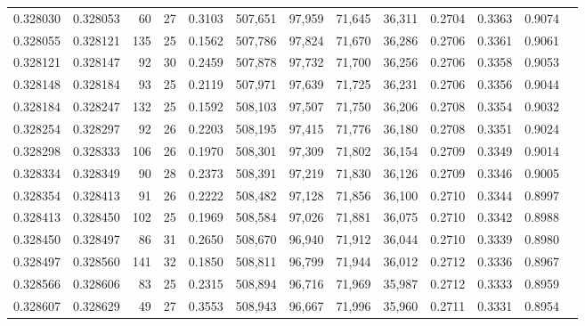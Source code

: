 \begin{tabular}{rrrrrrrrrrrrr}
0.328030 & 0.328053 &    60 &  27 &                                     0.3103 & 507,651 &  97,959 &  71,645 &  36,311 & 0.2704 & 0.3363 & 0.9074 \\
0.328055 & 0.328121 &   135 &  25 &                                     0.1562 & 507,786 &  97,824 &  71,670 &  36,286 & 0.2706 & 0.3361 & 0.9061 \\
0.328121 & 0.328147 &    92 &  30 &                                     0.2459 & 507,878 &  97,732 &  71,700 &  36,256 & 0.2706 & 0.3358 & 0.9053 \\
0.328148 & 0.328184 &    93 &  25 &                                     0.2119 & 507,971 &  97,639 &  71,725 &  36,231 & 0.2706 & 0.3356 & 0.9044 \\
0.328184 & 0.328247 &   132 &  25 &                                     0.1592 & 508,103 &  97,507 &  71,750 &  36,206 & 0.2708 & 0.3354 & 0.9032 \\
0.328254 & 0.328297 &    92 &  26 &                                     0.2203 & 508,195 &  97,415 &  71,776 &  36,180 & 0.2708 & 0.3351 & 0.9024 \\
0.328298 & 0.328333 &   106 &  26 &                                     0.1970 & 508,301 &  97,309 &  71,802 &  36,154 & 0.2709 & 0.3349 & 0.9014 \\
0.328334 & 0.328349 &    90 &  28 &                                     0.2373 & 508,391 &  97,219 &  71,830 &  36,126 & 0.2709 & 0.3346 & 0.9005 \\
0.328354 & 0.328413 &    91 &  26 &                                     0.2222 & 508,482 &  97,128 &  71,856 &  36,100 & 0.2710 & 0.3344 & 0.8997 \\
0.328413 & 0.328450 &   102 &  25 &                                     0.1969 & 508,584 &  97,026 &  71,881 &  36,075 & 0.2710 & 0.3342 & 0.8988 \\
0.328450 & 0.328497 &    86 &  31 &                                     0.2650 & 508,670 &  96,940 &  71,912 &  36,044 & 0.2710 & 0.3339 & 0.8980 \\
0.328497 & 0.328560 &   141 &  32 &                                     0.1850 & 508,811 &  96,799 &  71,944 &  36,012 & 0.2712 & 0.3336 & 0.8967 \\
0.328566 & 0.328606 &    83 &  25 &                                     0.2315 & 508,894 &  96,716 &  71,969 &  35,987 & 0.2712 & 0.3333 & 0.8959 \\
0.328607 & 0.328629 &    49 &  27 &                                     0.3553 & 508,943 &  96,667 &  71,996 &  35,960 & 0.2711 & 0.3331 & 0.8954 \\

\end{tabular}
